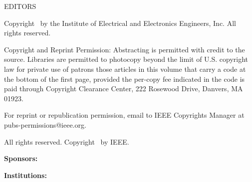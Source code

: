 \documentclass[letterpaper,oneside]{book}
\begin{document}
 EDITORS

 \isbn

 \catalognumber


\vspace{0.5cm}

\noindent Copyright \textcopyright \year\ by the Institute of Electrical and Electronics Engineers, Inc. All rights reserved.

\noindent Copyright and Reprint Permission: Abstracting is permitted with credit to the source. Libraries are permitted to photocopy beyond
the limit of U.S. copyright law for private use of patrons those articles in this volume that carry a code at the bottom of the first page,
provided the per-copy fee indicated in the code is paid through Copyright Clearance Center, 222 Rosewood Drive, Danvers, MA
01923. 

\noindent For reprint or republication permission, email to IEEE Copyrights Manager at pubs-permissions@ieee.org. 

\noindent All rights reserved. Copyright \textcopyright \year\ by IEEE.

\vspace{1.5cm}

{\Large \bfseries Sponsors:}

\vspace{-0.3cm}
\hspace{0.8cm}
\hspace{0.8cm}
\null\vspace{0.7cm}

{\Large \bfseries Institutions:}

\vspace{0.2cm}
\hspace{0.8cm}
\hspace{0.8cm}
\hspace{0.8cm}
\end{document}

